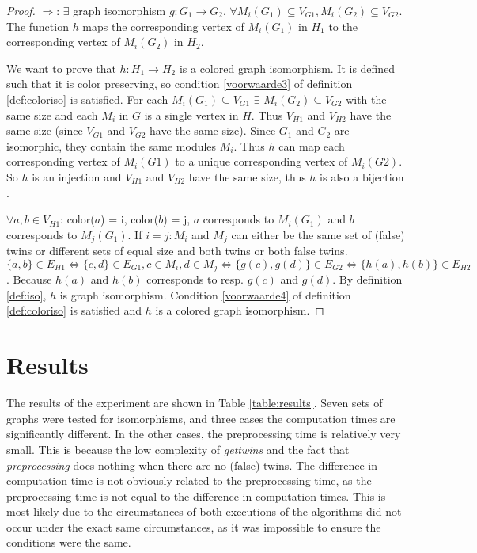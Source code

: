 \documentclass[twoside]{article}
\theoremstyle{definition}
\theoremstyle{plain}
\begin{document}
\begin{multicols}{2}
\begin{proof}
$\Rightarrow$: $\exists$ graph isomorphism $g: G_1 \to G_2$. $\forall M_i (G_1) \subseteq V_{G1}, M_i (G_2) \subseteq V_{G2}$. The function $h$ maps the corresponding vertex of $M_i (G_1)$ in $H_1$ to the corresponding vertex of $M_i (G_2)$ in $H_2$.

We want to prove that $h: H_1 \to H_2$ is a colored graph isomorphism. It is defined such that it is color preserving, so condition \ref{voorwaarde3} of definition \ref{def:coloriso} is satisfied. For each $M_i (G_1) \subseteq V_{G1}$ $\exists$ $M_i (G_2) \subseteq V_{G2}$ with the same size and each $M_i$ in $G$ is a single vertex in $H$. Thus $V_{H1}$ and $V_{H2}$ have the same size (since $V_{G1}$ and $V_{G2}$ have the same size). Since $G_1$ and $G_2$ are isomorphic, they contain the same modules $M_i$. Thus $h$ can map each corresponding vertex of $M_i (G1)$ to a unique corresponding vertex of $M_i (G2)$. So $h$ is an injection and $V_{H1}$ and $V_{H2}$ have the same size, thus $h$ is also a bijection \cite{website:proofwiki}.

$\forall a, b \in V_{H1}$: color($a$) = i, color($b$) = j, $a$ corresponds to $M_i (G_1)$ and $b$ corresponds to $M_j (G_1)$. If $i=j: M_i$ and $M_j$ can either be the same set of (false) twins or different sets of equal size and both twins or both false twins.  $ \{a, b\} \in E_{H1} \iff \{c,d\} \in E_{G1}, c \in  M_i, d \in  M_j \iff \{g(c),g(d)\} \in E_{G2} \iff \{h(a),h(b)\} \in E_{H2}$. Because $h(a)$ and $h(b)$ corresponds to resp. $g(c)$ and $g(d)$. By definition \ref{def:iso}, $h$ is graph isomorphism. Condition \ref{voorwaarde4} of definition \ref{def:coloriso} is satisfied and $h$ is a colored graph isomorphism.




\end{proof}

\section{Results}

The results of the experiment are shown in Table \ref{table:results}. Seven sets of graphs were tested for isomorphisms, and three cases the computation times are significantly different. In the other cases, the preprocessing time is relatively very small. This is because the low complexity of \emph{gettwins} and the fact that \emph{preprocessing} does nothing when there are no (false) twins. The difference in computation time is not obviously related to the preprocessing time, as the preprocessing time is not equal to the difference in computation times. This is most likely due to the circumstances of both executions of the algorithms did not occur under the exact same circumstances, as it was impossible to ensure the conditions were the same.  


\end{multicols}
\end{document}
